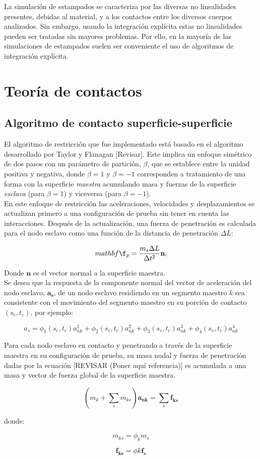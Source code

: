La simulación de estampados se caracteriza por las diversas no linealidades presentes, debidas al material, y a los contactos entre los diversos cuerpos analizados. Sin embargo, usando la integración explícita estas no linealidades pueden ser tratadas sin mayores problemas. Por ello, en la mayoría de las simulaciones de estampados suelen ser conveniente el uso de algoritmos de integración explícita.

\section{Teoría de contactos}

\subsection{Algoritmo de contacto superficie-superficie}

El algoritmo de restricción que fue implementado está basado en el algoritmo desarrollado por 
Taylor y Flanagan [Revisar]. Este implica un enfoque simétrico de dos pasos con un parámetro 
de partición, $\beta$, que se establece entre la unidad positiva y negativa, donde $\beta=1$ 
y $\beta=-1$ corresponden a tratamiento de una forma con la superficie \textit{maestra} 
acumulando masa y fuerzas de la superficie \textit{esclava} (para $\beta = 1$) y viceversa 
(para $\beta = -1$).\\

En este enfoque de restricción las aceleraciones, velocidades y desplazamientos se actualizan 
primero a una configuración de prueba sin tener en cuenta las interacciones. Después de la 
actualización, una fuerza de penetración es calculada para el nodo esclavo como una función 
de la distancia de penetración $\Delta L$:

$$
mathbf{\f_p} = \frac{m_s \Delta L}{\Delta t^2}\mathbf{n},
$$

Donde $\mathbf{n}$ es el vector normal a la superficie maestra.\\

Se desea que la respuesta de la componente normal del vector de aceleración del nodo esclavo, 
$\mathbf{a_s}$, de un nodo esclavo residiendo en un segmento maestro $k$ sea consistente con 
el movimiento del segmento maestro en su porción de contacto $(s_c,t_c)$, por ejemplo:

$$
a_s = \phi_1 (s_c,t_c) a_{nk}^1 + \phi_2 (s_c,t_c) a_{nk}^2 + \phi_3 (s_c,t_c) a_{nk}^3 + \phi_4 (s_c,t_c) a_{nk}^4
$$

Para cada nodo esclavo en contacto y penetrando a través de la superficie maestra en 
su configuración de prueba, su masa nodal y fuerza de penetración dadas por la ecuación 
[REVISAR (Poner aquí referencia)] es acumulada a una masa y vector de fuerza global de 
la superficie maestra.

$$
\left(
m_k + \sum_s m_{ks}
\right)
\mathbf{a_{nk}}
=
\sum_s \mathbf{f_{ks}}
$$

donde:

$$
m_{ks} = \phi_k m_s
$$

$$
\mathbf{f_{ks}} = \phi{k} \mathbf{f_s}
$$

